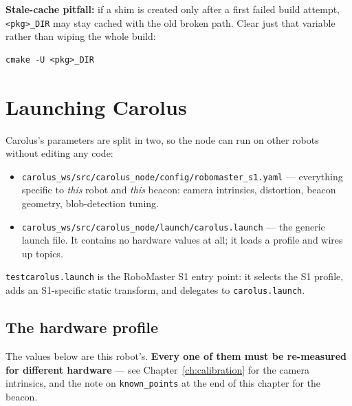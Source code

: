 \documentclass[11pt]{report}
\begin{document}
\textbf{Stale-cache pitfall:} if a shim is created only after a first failed
build attempt, \texttt{<pkg>\_DIR} may stay cached with the old broken path.
Clear just that variable rather than wiping the whole build:

\begin{lstlisting}[style=shell]
cmake -U <pkg>_DIR
\end{lstlisting}

\section{Launching Carolus}
\label{sec:launching}

Carolus's parameters are split in two, so the node can run on other robots
without editing any code:

\begin{itemize}
  \item \texttt{carolus\_ws/src/carolus\_node/config/robomaster\_s1.yaml}
  --- everything specific to \emph{this} robot and \emph{this} beacon: camera
  intrinsics, distortion, beacon geometry, blob-detection tuning.
  \item \texttt{carolus\_ws/src/carolus\_node/launch/carolus.launch} --- the
  generic launch file. It contains no hardware values at all; it loads a
  profile and wires up topics.
\end{itemize}

\texttt{testcarolus.launch} is the RoboMaster S1 entry point: it selects the
S1 profile, adds an S1-specific static transform, and delegates to
\texttt{carolus.launch}.

\subsection{The hardware profile}

The values below are this robot's. \textbf{Every one of them must be
re-measured for different hardware} --- see Chapter~\ref{ch:calibration} for
the camera intrinsics, and the note on \texttt{known\_points} at the end of
this chapter for the beacon.
\end{document}
